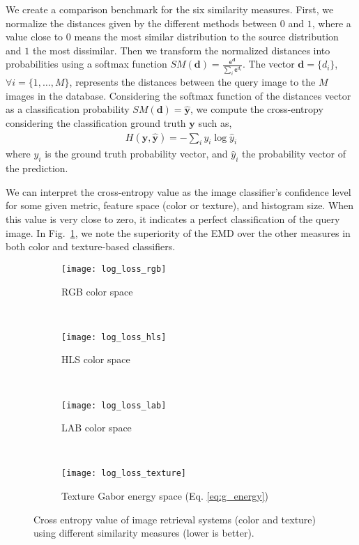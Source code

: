 We create a comparison benchmark for the six similarity measures. First, we normalize the distances given by the different methods between $0$ and $1$, where a value close to $0$ means the most similar distribution to the source distribution and $1$ the most dissimilar. Then we transform the normalized distances into probabilities using a softmax function $SM(\mathbf{d}) = \frac{\mathsf{e}^{\mathbf{d}}}{\sum_{i}\mathsf{e}^{d_i}}$. The vector $\mathbf{d}=\{d_i\}$, $\forall i=\{1, \ldots, M\}$, represents the distances between the query image to the $M$ images in the database. Considering the softmax function of the distances vector as a classification probability $SM(\mathbf{d})=\mathbf{\hat{y}}$,  we compute the cross-entropy \citep{Bishop:BOOK:2006} considering the classification ground truth $\mathbf{y}$ such as, 
\begin{eqnarray}
H(\mathbf{y}, \mathbf{\hat{y}}) = - \sum\nolimits_{i}{y_i}\log \hat{y}_i
\label{eq:cross-entropy}
\end{eqnarray}
where $y_i$ is the ground truth probability vector, and $\hat{y}_i$ the probability vector of the prediction.


We can interpret the cross-entropy value as the image classifier's confidence level for some given metric, feature space (color or texture), and histogram size. When this value is very close to zero, it indicates a perfect classification of the query image. In Fig.\ \ref{fig:cross_entropy}, we note the superiority of the EMD over the other measures in both color and texture-based classifiers.

\begin{figure}[ht]
    \centering
    \begin{subfigure}[b]{0.48\textwidth}
		\centering
		\texttt{[image: log\_loss\_rgb]}	
		\caption{RGB color space}
	\end{subfigure}
    ~ %
    \begin{subfigure}[b]{0.48\textwidth}
		\centering
		\texttt{[image: log\_loss\_hls]}	
		\caption{HLS color space}
	\end{subfigure}\\[2ex]
	
	
    \begin{subfigure}[b]{0.48\textwidth}
		\centering
		\texttt{[image: log\_loss\_lab]}	
		\caption{LAB color space}
	\end{subfigure}   
    ~ %
    \begin{subfigure}[b]{0.48\textwidth}
		\centering
		\texttt{[image: log\_loss\_texture]}	
		\caption{Texture Gabor energy space (Eq. \eqref{eq:g_energy})}
	\end{subfigure}  
		
	\caption{Cross entropy value of image retrieval systems (color and texture) using different similarity measures (lower is better).}
	\label{fig:cross_entropy}
\end{figure}

